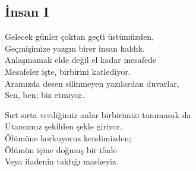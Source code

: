 \subsection{İnsan I}

Gelecek günler çoktan geçti üstümüzden, \\
Geçmişimize yazgın birer insan kaldık. \\
Anlaşmamak elde değil el kadar mesafede \\
Mesafeler işte, birbirini katlediyor. \\
Aramızda desen silinmeyen yazılardan duvarlar, \\
Sen, ben; biz etmiyor.

\noindent\newline
Sırt sırta verdiğimiz anlar birbirimizi tanımasak da \\
Utancımız şekilden şekle giriyor. \\
Ölümüne korkuyoruz kendimizden; \\
Ölümün içine doğmuş bir ifade \\
Veya ifadenin taktığı maskeyiz.
